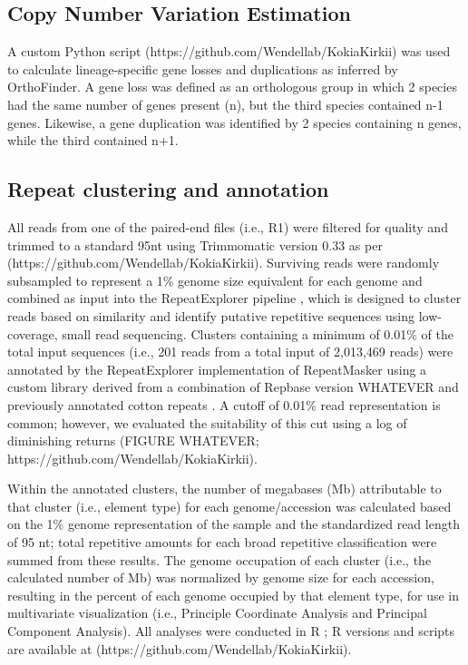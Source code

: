 \documentclass[10pt,letterpaper]{article}
\newcommand{\note}[2][]{\added[id=#1,remark={#2}]{}}
\begin{document}
\subsection*{Copy Number Variation Estimation}
A custom Python script (https://github.com/Wendellab/KokiaKirkii) was used to
calculate lineage-specific gene losses and duplications as inferred by
OrthoFinder. A gene loss was defined as an orthologous group in which 2 species
had the same number of genes present (n), but the third species contained n-1
genes. Likewise, a gene duplication was identified by 2 species containing n
genes, while the third contained n+1.\note[Justin]{Very rough estimate of gene
  loss and duplication; do we want more sophisticated method? Other parts to
  this section?}\note[Corrinne]{We probably should cross-check these to make
  sure things didn’t get screwed up, e.g., a gene “loss” is actually where
  something got thrown in as a “duplication” or as a loner (true singleton with
  no match in other genomes)}


\subsection*{Repeat clustering and annotation}
All reads from one of the paired-end files (i.e., R1) were filtered for quality
and trimmed to a standard 95nt using Trimmomatic version 0.33 \cite{Bolger2014}
as per (https://github.com/Wendellab/KokiaKirkii). Surviving reads were randomly
subsampled to represent a 1\% genome size equivalent for each genome
\cite{Hendrix2005, Wendel2002} and combined as input into the RepeatExplorer
pipeline \cite{Novak2013, Novak2010}, which is designed to cluster reads based
on similarity and identify putative repetitive sequences using low-coverage,
small read sequencing. Clusters containing a minimum of 0.01\% of the total
input sequences (i.e., 201 reads from a total input of 2,013,469 reads) were
annotated by the RepeatExplorer implementation of RepeatMasker \cite{Smit2015}
using a custom library derived from a combination of Repbase version WHATEVER
\cite{Bao2015} and previously annotated cotton repeats \cite{Paterson2012,
  Grover2008, Grover2007, Grover2004, Hawkins2006}. A cutoff of 0.01\% read
representation is common; however, we evaluated the suitability of this cut
using a log of diminishing returns (FIGURE WHATEVER;
https://github.com/Wendellab/KokiaKirkii).

Within the annotated clusters, the number of megabases (Mb) attributable to that
cluster (i.e., element type) for each genome/accession was calculated based on
the 1\% genome representation of the sample and the standardized read length of
95 nt; total repetitive amounts for each broad repetitive classification were
summed from these results. The genome occupation of each cluster (i.e., the
calculated number of Mb) was normalized by genome size for each accession,
resulting in the percent of each genome occupied by that element type, for use
in multivariate visualization (i.e., Principle Coordinate Analysis and Principal
Component Analysis). All analyses were conducted in R \cite{R2017}; R versions
and scripts are available at (https://github.com/Wendellab/KokiaKirkii).
\end{document}
